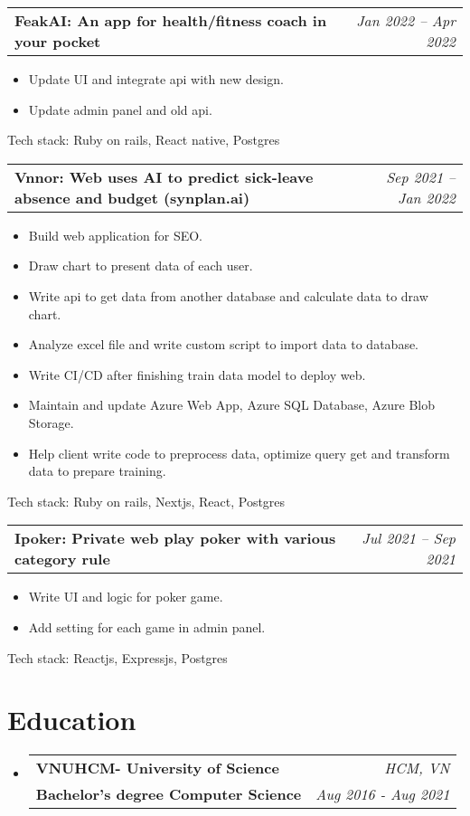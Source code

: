 \documentclass[letterpaper,11pt]{article}
\makeatletter
\newcommand{\resumeItem}[1]{
  \item\small{
    {#1 \vspace{-2pt}}
  }
}
\newcommand{\resumeSubheadingWithoutProject}[4]{
  \vspace{-2pt}\item
    \begin{tabular*}{0.97\textwidth}[t]{l@{\extracolsep{\fill}}r}
      \textbf{\Large#1} & \textit{#2} \\
      \textbf{\small#3} & \textit{\small #4} \\
    \end{tabular*}\vspace{-7pt}
}
\newcommand{\resumeSubheadingProject}[2]{
  \vspace{-2pt}\item
    \begin{tabular*}{0.97\textwidth}[t]{l@{\extracolsep{\fill}}r}
      \textbf{\small#1} & \textit{\small #2} \\
    \end{tabular*}\vspace{-7pt}
}
\newcommand{\resumeSubSubheading}[2]{
    \item
    \begin{tabular*}{0.97\textwidth}{l@{\extracolsep{\fill}}r}
      \textit{\small#1} & \textit{\small #2} \\
    \end{tabular*}\vspace{-7pt}
}
\newcommand{\resumeProjectHeading}[2]{
    \item
    \begin{tabular*}{0.97\textwidth}{l@{\extracolsep{\fill}}r}
      \small#1 & #2 \\
    \end{tabular*}\vspace{-7pt}
}
\newcommand{\resumeSubHeadingListStart}{\begin{itemize}[leftmargin=0.15in, label={}]}
\newcommand{\resumeSubHeadingListEnd}{\end{itemize}}
\newcommand{\resumeItemListStart}{\begin{itemize}}
\newcommand{\resumeItemListEnd}{\end{itemize}\vspace{-5pt}}
\makeatother
\begin{document}
\resumeSubheadingProject
{FeakAI: An app for health/fitness coach in your pocket}{Jan 2022 -- Apr 2022}
\resumeItemListStart
\resumeItem{ Update UI and integrate api with new design.}
\resumeItem{ Update admin panel and old api.}
\resumeItemListEnd
{Tech stack:}{ Ruby on rails, React native, Postgres}

\resumeSubheadingProject
{Vnnor: Web uses AI to predict sick-leave absence and budget (synplan.ai)}{Sep 2021 -- Jan 2022}
\resumeItemListStart
\resumeItem{ Build web application for SEO.}
\resumeItem{ Draw chart to present data of each user.}
\resumeItem{ Write api to get data from another database and calculate data to draw chart.}
\resumeItem{ Analyze excel file and write custom script to import data to database.}
\resumeItem{ Write CI/CD after finishing train data model to deploy web.}
\resumeItem{ Maintain and update Azure Web App, Azure SQL Database, Azure Blob Storage.}
\resumeItem{ Help client write code to preprocess data, optimize query get and transform data to prepare training.}
\resumeItemListEnd
{Tech stack:}{ Ruby on rails, Nextjs, React, Postgres}

\resumeSubheadingProject
{Ipoker: Private web play poker with various category rule}{Jul 2021 -- Sep 2021}
\resumeItemListStart
\resumeItem{ Write UI and logic for poker game.}
\resumeItem{ Add setting for each game in admin panel.}
\resumeItemListEnd
{Tech stack:}{ Reactjs, Expressjs, Postgres}

\section*{Education}
\resumeSubHeadingListStart
\resumeSubheadingWithoutProject
{VNUHCM- University of Science}{HCM, VN}
{Bachelor's degree Computer Science}{Aug 2016 - Aug 2021}
\resumeSubHeadingListEnd



\end{document}
